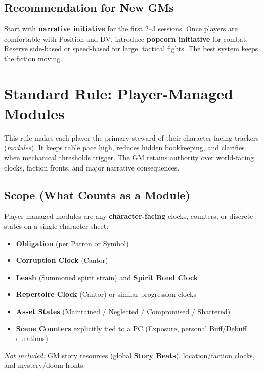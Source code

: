 \subsection{Recommendation for New GMs}
\label{subsec:initiative-recommendation}
Start with \textbf{narrative initiative} for the first 2–3 sessions. Once players are comfortable with Position and DV, introduce \textbf{popcorn initiative} for combat. Reserve side-based or speed-based for large, tactical fights. The best system keeps the fiction moving.

\section{Standard Rule: Player-Managed Modules}
\label{sec:player-managed-modules-gm}

This rule makes each player the primary steward of their character-facing trackers (\emph{modules}). It keeps table pace high, reduces hidden bookkeeping, and clarifies when mechanical thresholds trigger. The GM retains authority over world-facing clocks, faction fronts, and major narrative consequences.

\subsection{Scope (What Counts as a Module)}
\label{subsec:module-scope}
Player-managed modules are any \textbf{character-facing} clocks, counters, or discrete states on a single character sheet:
\begin{itemize}
  \item \textbf{Obligation} (per Patron or Symbol)
  \item \textbf{Corruption Clock} (Cantor)
  \item \textbf{Leash} (Summoned spirit strain) and \textbf{Spirit Bond Clock}
  \item \textbf{Repertoire Clock} (Cantor) or similar progression clocks
  \item \textbf{Asset States} (Maintained / Neglected / Compromised / Shattered)
  \item \textbf{Scene Counters} explicitly tied to a PC (Exposure, personal Buff/Debuff durations)
\end{itemize}
\textit{Not included:} GM story resources (global \textbf{Story Beats}), location/faction clocks, and mystery/doom fronts.

